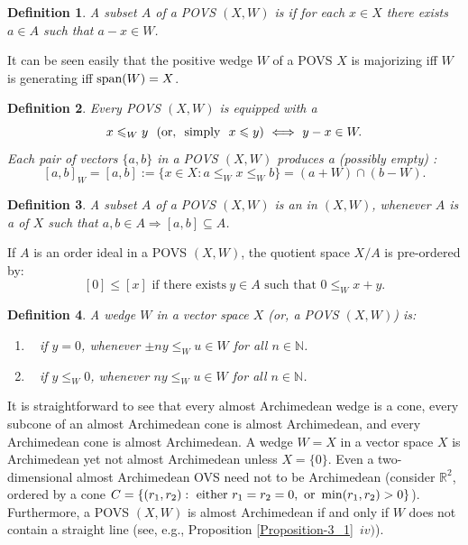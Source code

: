 \documentclass[10pt]{article}
\newtheorem{definition}{Definition}[section]
\newcommand{\spa}{\hbox{\rm span}}
\begin{document}
\begin{definition}\label{Definition-1_3}
A subset $A$ of a POVS $(X,W)$ is {\color{blue}{majorizing}} if for each $x\in X$ there exists $a\in A$ such that $a-x\in W$.
\end{definition}

\noindent
It can be seen easily that the positive wedge $W$ of a POVS $X$ is majorizing iff $W$ is generating iff $\spa(W)=X$.

\begin{definition}\label{Definition-1_4}
Every POVS $(X,W)$ is equipped with a {\color{blue}{partial pre-order}}
$$
   x\leqslant_W y\ \ \text{\rm(or, \ simply}  \ \ x\leqslant y)\ \Longleftrightarrow\ y-x\in W.
$$ 
Each pair of vectors $\{a,b\}$ in a POVS $(X,W)$ produces a {\em (}possibly empty{\em)} {\color{blue}{order interval}}:
$$
   [a,b]_W=[a,b]:=\{x\in X: a\leqslant_W x\leqslant_W b\}=(a+W)\cap(b-W).
$$
\end{definition}

\begin{definition}\label{Definition-1_5}
A subset $A$ of a POVS $(X,W)$ is an {\color{blue}{order ideal}} in $(X,W)$, whenever $A$ is a {\color{blue}{vector subspace}} of $X$ such that 
$a,b\in A\Longrightarrow [a,b]\subseteq A$. 
\end{definition}

\noindent
If $A$ is an order ideal in a POVS $(X,W)$, the quotient space $X/A$ is pre-ordered by:
$$
   [0] \leqslant [x] \text{ if there exists}\ y \in A \text{ such that } 0 \leqslant_W x + y.
$$

\begin{definition}\label{Definition-1_6}
A wedge $W$ in a vector space $X$ {\em (}or, a POVS $(X,W)${\em )} is:
\begin{enumerate}[-]
\item\
{\color{blue}{almost Archimedean}} if $y=0$, whenever $\pm ny\leqslant_W u\in W$ for all $n\in\mathbb{N}$.
\item\
{\color{blue}{Archimedean}} if $y\leqslant_W 0$, whenever $ny\leqslant_W u\in W$ for all $n\in\mathbb{N}$.
\end{enumerate}
\end{definition}

\noindent
It is straightforward to see that every almost Archimedean wedge is a cone, every subcone of an almost Archimedean cone is almost Archimedean, and
every Archimedean cone is almost Archime\-dean. A wedge $W=X$ in a vector space $X$ is Archimedean yet not almost Archimedean unless $X=\{0\}$.
Even a two-dimensional almost Archimedean OVS need not to be Archimedean
(consider $\mathbb{R}^2$, ordered by a cone $C=\{(r_1,r_2):\ \text{\rm either}\ r_1=r_2=0, \ \text{\rm or}\ \min(r_1,r_2)>0\}$).
Furthermore, a POVS $(X,W)$ is almost Archime\-dean if and only if $W$ does not contain a straight line (see, e.g., Proposition \ref{Proposition-3_1}~$iv)$).
\end{document}
